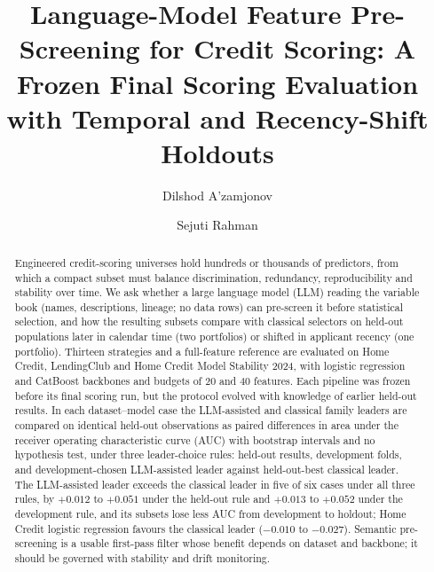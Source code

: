 \documentclass[final,5p,twocolumn]{elsarticle}
\begin{document}
\begin{frontmatter}

\title{Language-Model Feature Pre-Screening for Credit Scoring: A Frozen Final Scoring Evaluation with Temporal and Recency-Shift Holdouts}

\author[aff1,aff3]{Dilshod A'zamjonov}

\author[aff2]{Sejuti Rahman}


\address[aff1]{Department of Engineering, New Uzbekistan University, 1 Movarounnahr Street, Mirzo Ulugbek District, Tashkent, Uzbekistan}
\address[aff2]{Department of Computing, New Uzbekistan University, 1 Movarounnahr Street, Mirzo Ulugbek District, Tashkent, Uzbekistan}
\address[aff3]{Central Bank of the Republic of Uzbekistan, 6 Islam Karimov Street, Tashkent 100001, Uzbekistan}

\begin{abstract}
Engineered credit-scoring universes hold hundreds or thousands of predictors, from which a compact subset must balance discrimination, redundancy, reproducibility and stability over time. We ask whether a large language model (LLM) reading the variable book (names, descriptions, lineage; no data rows) can pre-screen it before statistical selection, and how the resulting subsets compare with classical selectors on held-out populations later in calendar time (two portfolios) or shifted in applicant recency (one portfolio). Thirteen strategies and a full-feature reference are evaluated on Home Credit, LendingClub and Home Credit Model Stability 2024, with logistic regression and CatBoost backbones and budgets of 20 and 40 features. Each pipeline was frozen before its final scoring run, but the protocol evolved with knowledge of earlier held-out results. In each dataset--model case the LLM-assisted and classical family leaders are compared on identical held-out observations as paired differences in area under the receiver operating characteristic curve (AUC) with bootstrap intervals and no hypothesis test, under three leader-choice rules: held-out results, development folds, and development-chosen LLM-assisted leader against held-out-best classical leader. The LLM-assisted leader exceeds the classical leader in five of six cases under all three rules, by $+0.012$ to $+0.051$ under the held-out rule and $+0.013$ to $+0.052$ under the development rule, and its subsets lose less AUC from development to holdout; Home Credit logistic regression favours the classical leader ($-0.010$ to $-0.027$). Semantic pre-screening is a usable first-pass filter whose benefit depends on dataset and backbone; it should be governed with stability and drift monitoring.
\end{abstract}


\end{frontmatter}
\end{document}
